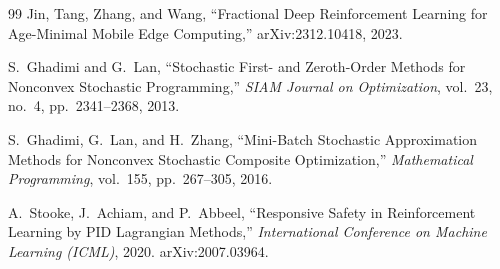 \documentclass[11pt]{article}
\begin{document}
\begin{thebibliography}{99}
Jin, Tang, Zhang, and Wang, ``Fractional Deep Reinforcement Learning for
Age-Minimal Mobile Edge Computing,'' arXiv:2312.10418, 2023.

S.~Ghadimi and G.~Lan, ``Stochastic First- and Zeroth-Order Methods for
Nonconvex Stochastic Programming,'' \emph{SIAM Journal on Optimization},
vol.~23, no.~4, pp.~2341--2368, 2013.

S.~Ghadimi, G.~Lan, and H.~Zhang, ``Mini-Batch Stochastic Approximation
Methods for Nonconvex Stochastic Composite Optimization,'' \emph{Mathematical
Programming}, vol.~155, pp.~267--305, 2016.

A.~Stooke, J.~Achiam, and P.~Abbeel, ``Responsive Safety in Reinforcement
Learning by PID Lagrangian Methods,'' \emph{International Conference on
Machine Learning (ICML)}, 2020. arXiv:2007.03964.

\end{thebibliography}
\end{document}
